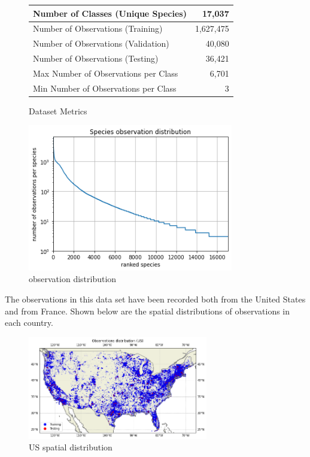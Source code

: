 \documentclass[12pt, oneside]{article}
\begin{document}
\begin{normalsize}
\begin{figure}[H]
\caption{Dataset Metrics}
\centering
\setlength{\tabcolsep}{0.5em} %
{\renewcommand{\arraystretch}{1.2}%
\begin{tabular}{ |l|r| }
\hline
 Number of Classes (Unique Species) & 17,037 \\
 \hline
 Number of Observations (Training) & 1,627,475 \\  
 \hline
 Number of Observations (Validation) & 40,080 \\
 \hline
 Number of Observations (Testing) & 36,421 \\
 \hline
 Max Number of Observations per Class & 6,701 \\
 \hline
 Min Number of Observations per Class & 3 \\
 \hline
\end{tabular}
}
\end{figure}

\begin{figure}[H]
\caption{observation distribution}
\centering
\includegraphics[width=0.8\textwidth]{observations}
\end{figure}

The observations in this data set have been recorded both from the United States and from France. Shown below are the spatial distributions of observations in each country.

\begin{figure}[H]
\caption{US spatial distribution}
\centering
\includegraphics[width=0.7\textwidth]{us_dist}
\end{figure}


\end{normalsize}
\end{document}
